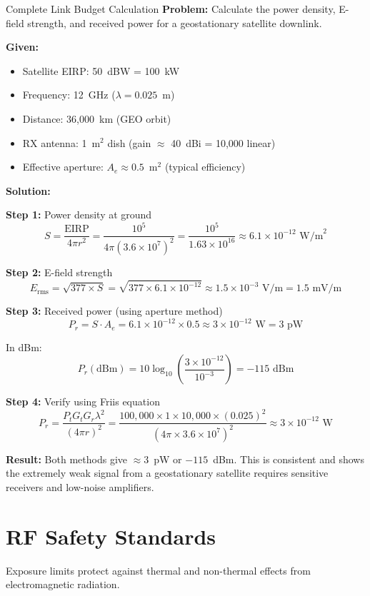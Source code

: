 \begin{calloutbox}{Complete Link Budget Calculation}
\textbf{Problem:} Calculate the power density, E-field strength, and received power for a geostationary satellite downlink.

\textbf{Given:}
\begin{itemize}
\item Satellite EIRP: 50~dBW = 100~kW
\item Frequency: 12~GHz ($\lambda = 0.025$~m)
\item Distance: 36,000~km (GEO orbit)
\item RX antenna: 1~m$^2$ dish (gain $\approx$ 40~dBi = 10,000 linear)
\item Effective aperture: $A_e \approx 0.5$~m$^2$ (typical efficiency)
\end{itemize}

\textbf{Solution:}

\textbf{Step 1:} Power density at ground
\[
S = \frac{\text{EIRP}}{4\pi r^2} = \frac{10^5}{4\pi (3.6 \times 10^7)^2} = \frac{10^5}{1.63 \times 10^{16}} \approx 6.1 \times 10^{-12} \text{~W/m}^2
\]

\textbf{Step 2:} E-field strength
\[
E_{\text{rms}} = \sqrt{377 \times S} = \sqrt{377 \times 6.1 \times 10^{-12}} \approx 1.5 \times 10^{-3} \text{~V/m} = 1.5 \text{~mV/m}
\]

\textbf{Step 3:} Received power (using aperture method)
\[
P_r = S \cdot A_e = 6.1 \times 10^{-12} \times 0.5 \approx 3 \times 10^{-12} \text{~W} = 3 \text{~pW}
\]

In dBm:
\[
P_r(\text{dBm}) = 10\log_{10}\left(\frac{3 \times 10^{-12}}{10^{-3}}\right) = -115 \text{~dBm}
\]

\textbf{Step 4:} Verify using Friis equation
\[
P_r = \frac{P_t G_t G_r \lambda^2}{(4\pi r)^2} = \frac{100{,}000 \times 1 \times 10{,}000 \times (0.025)^2}{(4\pi \times 3.6 \times 10^7)^2} \approx 3 \times 10^{-12} \text{~W}
\]

\textbf{Result:} Both methods give $\approx$3~pW or $-115$~dBm. This is consistent and shows the extremely weak signal from a geostationary satellite requires sensitive receivers and low-noise amplifiers.
\end{calloutbox}

\section{RF Safety Standards}

Exposure limits protect against thermal and non-thermal effects from electromagnetic radiation.

